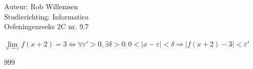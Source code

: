 \documentclass[a4paper]{article}
\begin{document}
\noindent \large Auteur: Rob Willemsen \\
\noindent \large Studierichting: Informatica\\
\noindent \large Oefeningenreeks 2C nr. 9.7\\

\medskip

\normalsize

$\lim\limits_{x \rightarrow \varepsilon} f(x+2) = 3 \Leftrightarrow \forall \varepsilon' > 0, \exists \delta > 0 : 0 < |x - \varepsilon| < \delta \Rightarrow |f(x+2) - 3| < \varepsilon'$ \\

\begin{thebibliography}{999}
\end{thebibliography}
\end{document}
